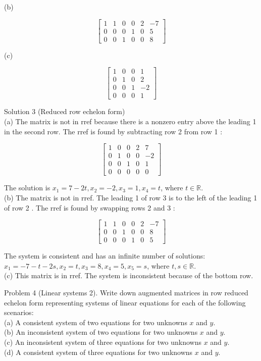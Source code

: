 \documentclass[10pt]{article}
\begin{document}
(b)

$$
\left[\begin{array}{ccccc|c}
1 & 1 & 0 & 0 & 2 & -7 \\
0 & 0 & 0 & 1 & 0 & 5 \\
0 & 0 & 1 & 0 & 0 & 8
\end{array}\right]
$$

(c)

$$
\left[\begin{array}{ccc|c}
1 & 0 & 0 & 1 \\
0 & 1 & 0 & 2 \\
0 & 0 & 1 & -2 \\
0 & 0 & 0 & 1
\end{array}\right]
$$

Solution 3 (Reduced row echelon form)\\
(a) The matrix is not in rref because there is a nonzero entry above the leading 1 in the second row. The rref is found by subtracting row 2 from row 1 :

$$
\left[\begin{array}{cccc|c}
1 & 0 & 0 & 2 & 7 \\
0 & 1 & 0 & 0 & -2 \\
0 & 0 & 1 & 0 & 1 \\
0 & 0 & 0 & 0 & 0
\end{array}\right]
$$

The solution is $x_{1}=7-2 t, x_{2}=-2, x_{3}=1, x_{4}=t$, where $t \in \mathbb{R}$.\\
(b) The matrix is not in rref. The leading 1 of row 3 is to the left of the leading 1 of row 2 . The rref is found by swapping rows 2 and 3 :

$$
\left[\begin{array}{ccccc|c}
1 & 1 & 0 & 0 & 2 & -7 \\
0 & 0 & 1 & 0 & 0 & 8 \\
0 & 0 & 0 & 1 & 0 & 5
\end{array}\right]
$$

The system is consistent and has an infinite number of solutions:\\
$x_{1}=-7-t-2 s, x_{2}=t, x_{3}=8, x_{4}=5, x_{5}=s$, where $t, s \in \mathbb{R}$.\\
(c) This matrix is in rref. The system is inconsistent because of the bottom row.

Problem 4 (Linear systems 2). Write down augmented matrices in row reduced echelon form representing systems of linear equations for each of the following scenarios:\\
(a) A consistent system of two equations for two unknowns $x$ and $y$.\\
(b) An inconsistent system of two equations for two unknowns $x$ and $y$.\\
(c) An inconsistent system of three equations for two unknowns $x$ and $y$.\\
(d) A consistent system of three equations for two unknowns $x$ and $y$.
\end{document}

